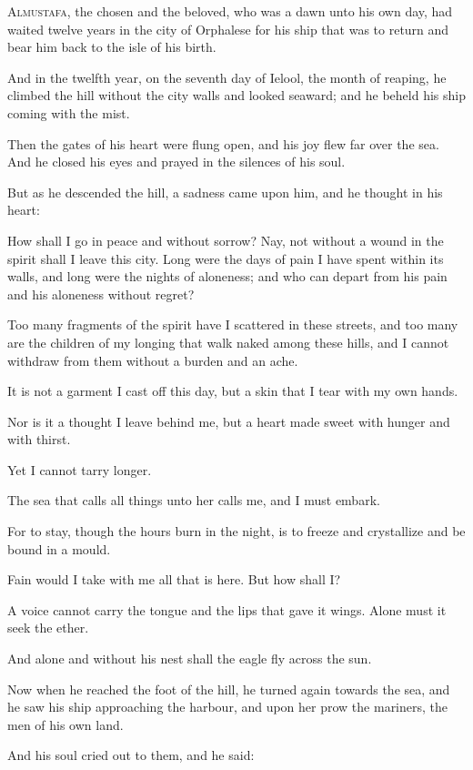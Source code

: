 \lettrine{A}{lmustafa}, the chosen and the
beloved, who was a dawn unto his own
day, had waited twelve years in the city
of Orphalese for his ship that was to
return and bear him back to the isle of
his birth.

And in the twelfth year, on the seventh
day of Ielool, the month of reaping, he
climbed the hill without the city walls
and looked seaward; and he beheld his
ship coming with the mist.

Then the gates of his heart were flung
open, and his joy flew far over the sea.
And he closed his eyes and prayed in the
silences of his soul.



But as he descended the hill, a sadness
came upon him, and he thought in his
heart:

How shall I go in peace and without
sorrow? Nay, not without a wound in the
spirit shall I leave this city. Long
were the days of pain I have spent
within its walls, and long were the
nights of aloneness; and who can depart
from his pain and his aloneness without
regret?

Too many fragments of the spirit have I
scattered in these streets, and too many
are the children of my longing that walk
naked among these hills, and I cannot
withdraw from them without a burden and
an ache.

It is not a garment I cast off this
day, but a skin that I tear with my own
hands.

Nor is it a thought I leave behind me,
but a heart made sweet with hunger and
with thirst.


Yet I cannot tarry longer.

The sea that calls all things unto her
calls me, and I must embark.

For to stay, though the hours burn in
the night, is to freeze and crystallize
and be bound in a mould.

Fain would I take with me all that is
here. But how shall I?

A voice cannot carry the tongue and
the lips that gave it wings. Alone
must it seek the ether.

And alone and without his nest shall the
eagle fly across the sun.


Now when he reached the foot of the
hill, he turned again towards the sea,
and he saw his ship approaching the
harbour, and upon her prow the mariners,
the men of his own land.

And his soul cried out to them, and he
said:

